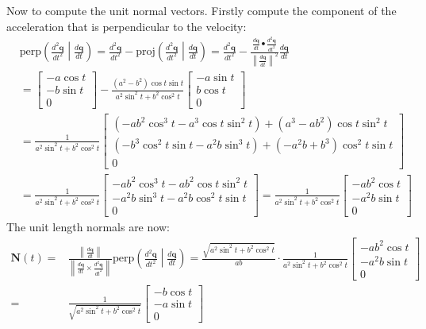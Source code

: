 \documentclass{article}
\begin{document}
Now to compute the unit normal vectors. Firstly compute the component of the acceleration that is perpendicular to the velocity: 
\begin{align*}
& \text{perp}\left(\frac{d^2 \mathbf{q}}{dt^2}\middle|\frac{d\mathbf{q}}{dt}\right) 
= \frac{d^2 \mathbf{q}}{dt^2} - \text{proj}\left(\frac{d^2 \mathbf{q}}{dt^2}\middle|\frac{d\mathbf{q}}{dt}\right) 
= \frac{d^2 \mathbf{q}}{dt^2} - \frac{\frac{d\mathbf{q}}{dt} \bullet \frac{d^2 \mathbf{q}}{dt^2}}{\left\|\frac{d\mathbf{q}}{dt}\right\|^2}\frac{d\mathbf{q}}{dt} \\
& = \begin{bmatrix} -a \cos t \\ -b \sin t \\ 0 \end{bmatrix} - \frac{(a^2 - b^2) \cos t \sin t}{a^2\sin^2 t + b^2 \cos^2 t}\begin{bmatrix} -a \sin t \\ b \cos t \\ 0 \end{bmatrix} \\
& = \frac{1}{a^2\sin^2 t + b^2 \cos^2 t}\begin{bmatrix} 
(-ab^2 \cos^3 t - a^3 \cos t \sin^2 t) + (a^3 - ab^2)\cos t \sin^2 t \\  
(-b^3 \cos^2 t \sin t - a^2 b \sin^3 t) + (-a^2b + b^3)\cos^2 t \sin t \\
0 \end{bmatrix} \\  
& = \frac{1}{a^2\sin^2 t + b^2 \cos^2 t}\begin{bmatrix} 
-ab^2 \cos^3 t - ab^2 \cos t \sin^2 t \\  
-a^2 b \sin^3 t - a^2b \cos^2 t \sin t \\
0 \end{bmatrix}  
= \frac{1}{a^2\sin^2 t + b^2 \cos^2 t}\begin{bmatrix} 
-ab^2 \cos t \\  
-a^2 b \sin t \\
0 \end{bmatrix}
\end{align*}
The unit length normals are now:
\begin{align*}
\mathbf{N}(t) = & \frac{\left\|\frac{d\mathbf{q}}{dt}\right\|}{\left\|\frac{d\mathbf{q}}{dt} \times \frac{d^2 \mathbf{q}}{dt^2}\right\|}\text{perp}\left(\frac{d^2 \mathbf{q}}{dt^2}\middle|\frac{d\mathbf{q}}{dt}\right) 
= \frac{\sqrt{a^2\sin^2 t + b^2 \cos^2 t}}{ab} \cdot \frac{1}{a^2\sin^2 t + b^2 \cos^2 t}\begin{bmatrix} 
-ab^2 \cos t \\  
-a^2 b \sin t \\
0 \end{bmatrix} \\
= & \frac{1}{\sqrt{a^2\sin^2 t + b^2 \cos^2 t}}\begin{bmatrix} -b\cos t \\ -a \sin t \\ 0 \end{bmatrix}  
\end{align*}
\end{document}
